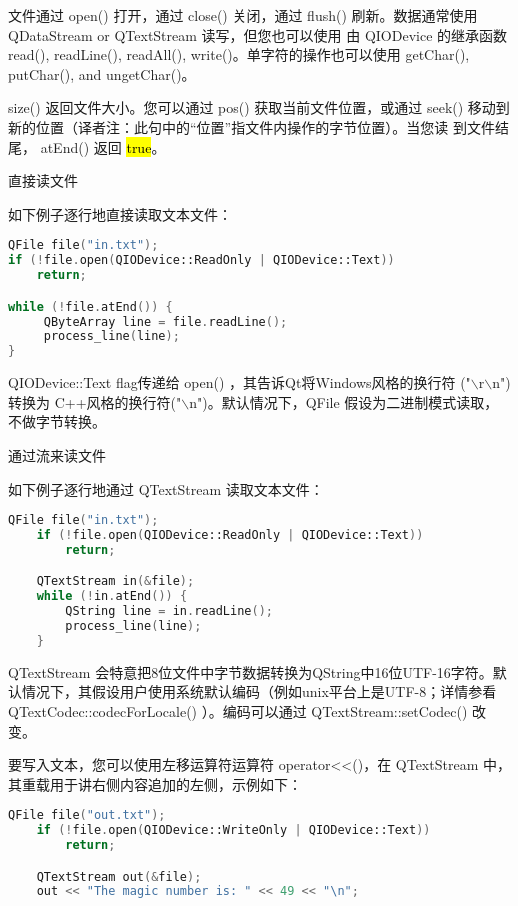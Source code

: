 文件通过 open() 打开，通过 close() 关闭，通过 flush() 刷新。数据通常使用 QDataStream or QTextStream 读写，但您也可以使用 由 QIODevice 的继承函数 read(), readLine(), readAll(), write()。单字符的操作也可以使用 getChar(), putChar(), and ungetChar()。

size() 返回文件大小。您可以通过 pos() 获取当前文件位置，或通过 seek()
移动到新的位置（译者注：此句中的“位置”指文件内操作的字节位置）。当您读
到文件结尾， atEnd() 返回 \hl{true}。

直接读文件

如下例子逐行地直接读取文本文件：

\begin{lstlisting}[language=C++]
QFile file("in.txt");
if (!file.open(QIODevice::ReadOnly | QIODevice::Text))
    return;

while (!file.atEnd()) {
     QByteArray line = file.readLine();
     process_line(line);
}
\end{lstlisting}

QIODevice::Text flag传递给 open() ，其告诉Qt将Windows风格的换行符
("$\backslash$r$\backslash$n") 转换为 C++风格的换行符("$\backslash$n")。默认情况下，QFile 假设为二进制模式读取，不做字节转换。

通过流来读文件

如下例子逐行地通过 QTextStream 读取文本文件：

\begin{lstlisting}[language=C++]
    QFile file("in.txt");
    if (!file.open(QIODevice::ReadOnly | QIODevice::Text))
        return;

    QTextStream in(&file);
    while (!in.atEnd()) {
        QString line = in.readLine();
        process_line(line);
    }
\end{lstlisting}

QTextStream 会特意把8位文件中字节数据转换为QString中16位UTF-16字符。默认情况下，其假设用户使用系统默认编码（例如unix平台上是UTF-8；详情参看 QTextCodec::codecForLocale() ）。编码可以通过 QTextStream::setCodec() 改变。

要写入文本，您可以使用左移运算符运算符 operator<<()，在 QTextStream 中，
其重载用于讲右侧内容追加的左侧，示例如下：

\begin{lstlisting}[language=C++]
    QFile file("out.txt");
    if (!file.open(QIODevice::WriteOnly | QIODevice::Text))
        return;

    QTextStream out(&file);
    out << "The magic number is: " << 49 << "\n";

\end{lstlisting}

